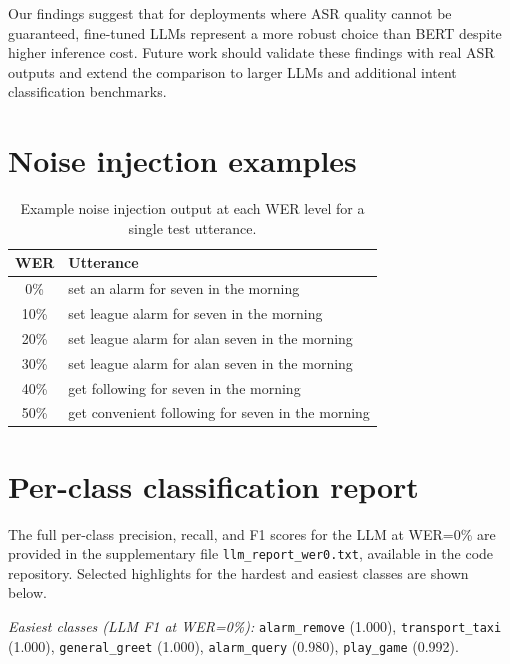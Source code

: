 \documentclass[11pt,a4paper]{article}
\begin{document}
Our findings suggest that for deployments where ASR quality cannot be guaranteed, fine-tuned LLMs represent a more robust choice than BERT despite higher inference cost. Future work should validate these findings with real ASR outputs and extend the comparison to larger LLMs and additional intent classification benchmarks.




\appendix

\section{Noise injection examples}
\label{app:noise}

\begin{table}[H]
\centering
\caption{Example noise injection output at each WER level for a single test utterance.}
\label{tab:noise_example}
\begin{tabular}{cp{10cm}}
\toprule
\textbf{WER} & \textbf{Utterance} \\
\midrule
0\%  & set an alarm for seven in the morning \\
10\% & set league alarm for seven in the morning \\
20\% & set league alarm for alan seven in the morning \\
30\% & set league alarm for alan seven in the morning \\
40\% & get following for seven in the morning \\
50\% & get convenient following for seven in the morning \\
\bottomrule
\end{tabular}
\end{table}

\section{Per-class classification report}
\label{app:per_class}

The full per-class precision, recall, and F1 scores for the LLM at WER=0\% are provided in the supplementary file \texttt{llm\_report\_wer0.txt}, available in the code repository. Selected highlights for the hardest and easiest classes are shown below.

\textit{Easiest classes (LLM F1 at WER=0\%):} \texttt{alarm\_remove} (1.000), \texttt{transport\_taxi} (1.000), \texttt{general\_greet} (1.000), \texttt{alarm\_query} (0.980), \texttt{play\_game} (0.992).
\end{document}
